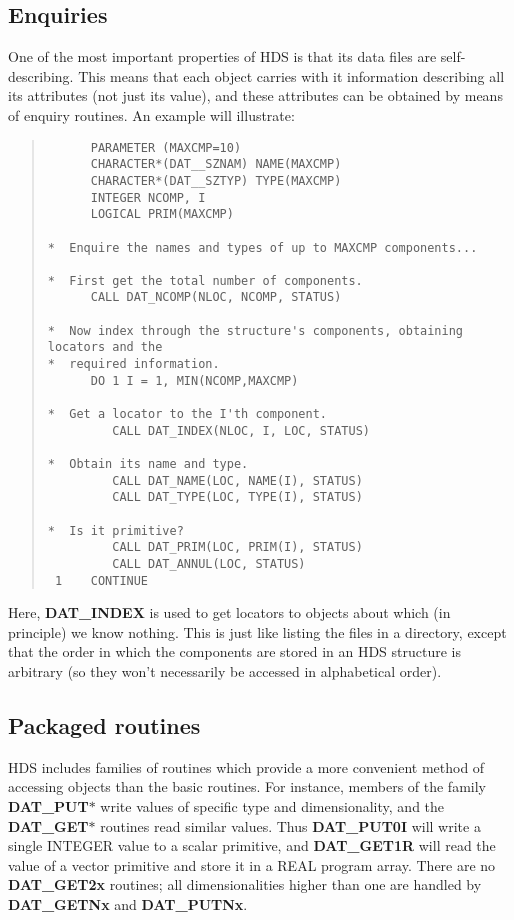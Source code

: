 \subsection{Enquiries}

One of the most important properties of HDS is that its data files are
self-describing.
This means that each object carries with it information describing all its
attributes (not just its value), and these attributes can be obtained by means
of enquiry routines.
An example will illustrate:

\begin{quote}

\begin{small}
\begin{verbatim}
      PARAMETER (MAXCMP=10)
      CHARACTER*(DAT__SZNAM) NAME(MAXCMP)
      CHARACTER*(DAT__SZTYP) TYPE(MAXCMP)
      INTEGER NCOMP, I
      LOGICAL PRIM(MAXCMP)

*  Enquire the names and types of up to MAXCMP components...

*  First get the total number of components.
      CALL DAT_NCOMP(NLOC, NCOMP, STATUS)

*  Now index through the structure's components, obtaining locators and the
*  required information.
      DO 1 I = 1, MIN(NCOMP,MAXCMP)

*  Get a locator to the I'th component.
         CALL DAT_INDEX(NLOC, I, LOC, STATUS)

*  Obtain its name and type.
         CALL DAT_NAME(LOC, NAME(I), STATUS)
         CALL DAT_TYPE(LOC, TYPE(I), STATUS)

*  Is it primitive?
         CALL DAT_PRIM(LOC, PRIM(I), STATUS)
         CALL DAT_ANNUL(LOC, STATUS)
 1    CONTINUE
\end{verbatim}
\end{small}

\end{quote}
Here, {\bf DAT\_INDEX} is used to get locators to objects about which (in
principle) we know nothing.
This is just like listing the files in a directory, except that the order in
which the components are stored in an HDS structure is arbitrary (so they
won't necessarily be accessed in alphabetical order). 

\subsection{Packaged routines}
\label{S_package}

HDS includes families of routines which provide a more convenient method of
accessing objects than the basic routines.
For instance, members of the family {\bf DAT\_PUT$*$} write values of specific
type and dimensionality, and the {\bf DAT\_GET$*$} routines read similar values.
Thus {\bf DAT\_PUT0I} will write a single INTEGER value to a scalar primitive,
and {\bf DAT\_GET1R} will read the value of a vector primitive and store it in a
REAL program array.
There are no {\bf DAT\_GET2x} routines; all dimensionalities higher than one
are handled by {\bf DAT\_GETNx} and {\bf DAT\_PUTNx}. 

